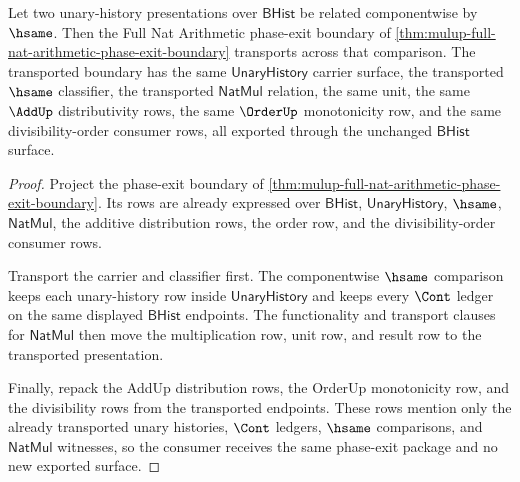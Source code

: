 \begin{theorem}
\label{thm:mulup-full-nat-arithmetic-hsame-transport-boundary}
Let two unary-history presentations over $\mathsf{BHist}$ be related
componentwise by $\hsame$. Then the Full Nat Arithmetic phase-exit boundary of
\autoref{thm:mulup-full-nat-arithmetic-phase-exit-boundary} transports across
that comparison. The transported boundary has the same
$\mathsf{UnaryHistory}$ carrier surface, the transported $\hsame$ classifier,
the transported $\mathsf{NatMul}$ relation, the same unit, the same $\AddUp$
distributivity rows, the same $\OrderUp$ monotonicity row, and the same
divisibility-order consumer rows, all exported through the unchanged
$\mathsf{BHist}$ surface.
\end{theorem}
\begin{proof}
Project the phase-exit boundary of
\autoref{thm:mulup-full-nat-arithmetic-phase-exit-boundary}. Its rows are
already expressed over $\mathsf{BHist}$, $\mathsf{UnaryHistory}$, $\hsame$,
$\mathsf{NatMul}$, the additive distribution rows, the order row, and the
divisibility-order consumer rows.

Transport the carrier and classifier first. The componentwise $\hsame$
comparison keeps each unary-history row inside $\mathsf{UnaryHistory}$ and
keeps every $\Cont$ ledger on the same displayed $\mathsf{BHist}$ endpoints.
The functionality and transport clauses for $\mathsf{NatMul}$ then move the
multiplication row, unit row, and result row to the transported presentation.

Finally, repack the AddUp distribution rows, the OrderUp monotonicity row, and
the divisibility rows from the transported endpoints. These rows mention only
the already transported unary histories, $\Cont$ ledgers, $\hsame$
comparisons, and $\mathsf{NatMul}$ witnesses, so the consumer receives the
same phase-exit package and no new exported surface.
\end{proof}

